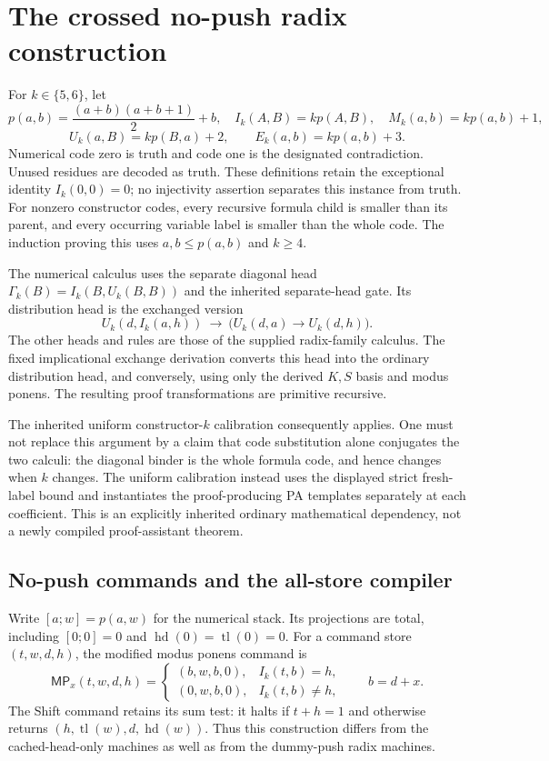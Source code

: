 \section{The crossed no-push radix construction}

For $k\in\{5,6\}$, let
\[
 p(a,b)=\frac{(a+b)(a+b+1)}2+b,
 \quad I_k(A,B)=k p(A,B),\quad M_k(a,b)=k p(a,b)+1,
\]
\[
 U_k(a,B)=k p(B,a)+2,\qquad E_k(a,b)=k p(a,b)+3.
\]
Numerical code zero is truth and code one is the designated contradiction.
Unused residues are decoded as truth. These definitions retain the exceptional
identity $I_k(0,0)=0$; no injectivity assertion separates this instance from truth.
For nonzero constructor codes, every recursive formula child is smaller than
its parent, and every occurring variable label is smaller than the whole code.
The induction proving this uses $a,b\le p(a,b)$ and $k\ge4$.

The numerical calculus uses the separate diagonal head
$\Gamma_k(B)=I_k(B,U_k(B,B))$ and the inherited separate-head gate.
Its distribution head is the exchanged version
\[
 U_k(d,I_k(a,h))\ \longrightarrow\
       \bigl(U_k(d,a)\longrightarrow U_k(d,h)\bigr).
\]
The other heads and rules are those of the supplied radix-family calculus.
The fixed implicational exchange derivation converts this head into the ordinary
distribution head, and conversely, using only the derived $K,S$ basis and modus
ponens. The resulting proof transformations are primitive recursive.

The inherited uniform constructor-$k$ calibration consequently applies. One
must not replace this argument by a claim that code substitution alone conjugates
the two calculi: the diagonal binder is the whole formula code, and hence changes
when $k$ changes. The uniform calibration instead uses the displayed strict
fresh-label bound and instantiates the proof-producing PA templates separately
at each coefficient. This is an explicitly inherited ordinary mathematical
dependency, not a newly compiled proof-assistant theorem.

\subsection{No-push commands and the all-store compiler}

Write $[a;w]=p(a,w)$ for the numerical stack. Its projections are total, including
$[0;0]=0$ and $\operatorname{hd}(0)=\operatorname{tl}(0)=0$. For a command store
$(t,w,d,h)$, the modified modus ponens command is
\[
 \mathsf{MP}_x(t,w,d,h)=
 \begin{cases}
   (b,w,b,0),&I_k(t,b)=h,\\
   (0,w,b,0),&I_k(t,b)\ne h,
 \end{cases}\qquad b=d+x.
\]
The Shift command retains its sum test: it halts if $t+h=1$ and otherwise returns
$(h,\operatorname{tl}(w),d,\operatorname{hd}(w))$. Thus this construction differs
from the cached-head-only machines as well as from the dummy-push radix machines.


